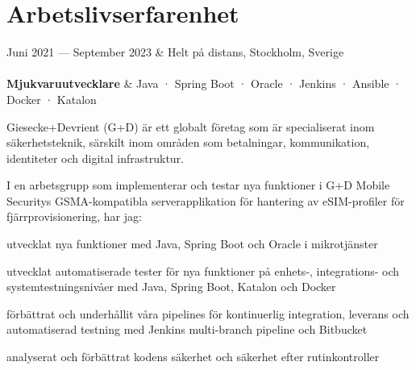 \documentclass{cv-stylish}
\begin{document}
\begin{center}
\begin{adjustwidth}{1cm}{1cm}

\end{adjustwidth}


\section{Arbetslivserfarenhet}

\begin{JobTable}
  Juni 2021 --- September 2023 & \hfill Helt på distans, Stockholm, Sverige \\
   \\[3pt]
  \hspace{5mm} \textbf{Mjukvaruutvecklare}
  & \hfill Java · Spring Boot · Oracle · Jenkins · Ansible · Docker · Katalon \\
\end{JobTable}
\begin{adjustwidth}{0.015\linewidth}{0.015\linewidth}
Giesecke+Devrient (G+D) är ett globalt företag som är specialiserat
inom säkerhetsteknik, särskilt inom områden som betalningar,
kommunikation, identiteter och digital infrastruktur.

I en arbetsgrupp som implementerar och testar nya funktioner i
G+D Mobile Securitys GSMA-kompatibla serverapplikation för hantering
av eSIM-profiler för fjärrprovisionering, har jag:

\begin{compactitem}
  \item utvecklat nya funktioner med Java, Spring Boot och Oracle i mikrotjänster
  \item utvecklat automatiserade tester för nya funktioner på enhets-, integrations- och
    systemtestningsnivåer med Java, Spring Boot, Katalon och Docker
  \item förbättrat och underhållit våra pipelines för kontinuerlig
    integration, leverans och automatiserad testning med Jenkins
    multi-branch pipeline och Bitbucket
  \item analyserat och förbättrat kodens säkerhet och säkerhet efter rutinkontroller
\end{compactitem}
\end{adjustwidth}


\end{center}
\end{document}
